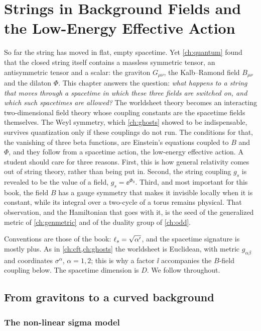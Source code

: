 \chapter{Strings in Background Fields and the Low-Energy Effective Action}\label{ch:backgrounds}

So far the string has moved in flat, empty spacetime. Yet \cref{ch:quantum} found that the
closed string itself contains a massless symmetric tensor, an antisymmetric tensor and a
scalar: the graviton $G_{\mu\nu}$, the Kalb--Ramond field $B_{\mu\nu}$ and the dilaton
$\Phi$. This chapter answers the question: \emph{what happens to a string that moves through a
spacetime in which these three fields are switched on, and which such spacetimes are
allowed?} The worldsheet theory
becomes an interacting two-dimensional field theory whose coupling constants are the
spacetime fields themselves. The Weyl symmetry, which \cref{ch:ghosts} showed to be
indispensable, survives quantization only if these couplings do not run. The conditions for
that, the vanishing of three beta functions, are Einstein's equations coupled to $B$ and
$\Phi$, and they follow from a spacetime action, the low-energy effective action. A
student should care for three reasons. First, this is how general relativity comes out of
string theory, rather than being put in. Second, the string coupling $g_s$ is revealed to be
the value of a field, $g_s=\ee^{\Phi_0}$. Third, and most important for this book, the field
$B$ has a gauge symmetry that makes it invisible locally when it is constant, while its
integral over a two-cycle of a torus remains physical. That observation, and the
Hamiltonian that goes with it, is the seed of the generalized metric of \cref{ch:genmetric}
and of the duality group of \cref{ch:odd}.

Conventions are those of the book: $\ell_s=\sqrt{\alpha'}$, and the spacetime signature is
mostly plus. As in \cref{ch:cft,ch:ghosts} the worldsheet is Euclidean, with metric
$g_{\alpha\beta}$ and coordinates $\sigma^\alpha$, $\alpha=1,2$; this is why a factor $\ii$
accompanies the $B$-field coupling below. The spacetime dimension is $D$. We follow
 throughout.

\section{From gravitons to a curved background}\label{sec:backgrounds:sigma}

\subsection{The non-linear sigma model}

